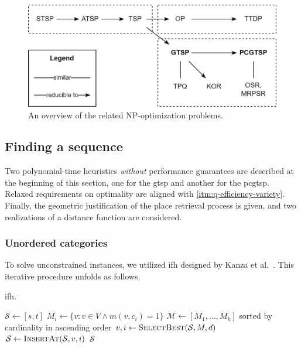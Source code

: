 \begin{figure}[!h]
\centering
\includegraphics[width=0.9\linewidth]{img/design/overview-npo-problems.png}
\caption{An overview of the related NP-optimization problems.}
\label{fig:overview-npo-problems}
\end{figure}

\subsection{Finding a sequence}\label{ssec:finding-a-sequence}

Two polynomial-time heuristics \emph{without} performance guarantees are described at the beginning of this section, one for the \acs{gtsp} and another for the \acs{pcgtsp}. Relaxed requirements on optimality are aligned with \ref{itm:q-efficiency-variety}. Finally, the geometric jus\-ti\-fi\-ca\-tion of the place retrieval process is given, and two realizations of a dis\-tance function are considered.

\subsubsection*{Unordered categories}

To solve unconstrained instances, we utilized \ac{ifh} designed by Kanza et al.~\cite{kanza08}. This iterative procedure unfolds as follows.

\begin{algorithm}
\caption{\acl{ifh}.}\label{alg:if-heuristic}
\begin{algorithmic}
  \State $\mathcal{S} \gets \left[ s, t \right]$ 
    \State $M_{i} \leftarrow \{ v : v \in V \wedge m(v, c_{i}) = 1 \}$ 
  \EndFor
  \State $\mathcal{M} \gets \left[ M_{1}, \ldots, M_{k} \right]$ sorted by cardinality in ascending order
    \State $v, i \gets \textsc{SelectBest}(\mathcal{S}, M, d)$
    \State $\mathcal{S} \gets \textsc{InsertAt}(\mathcal{S}, v, i)$
  \EndFor
  \State \Return $\mathcal{S}$
\EndFunction
\end{algorithmic}
\end{algorithm}

